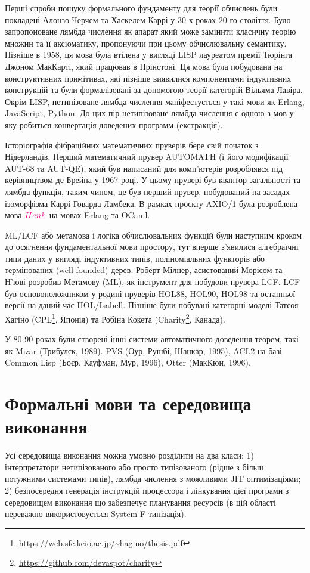 Перші спроби пошуку формального фундаменту для теорії обчислень були покладені
Алонзо Черчем та Хаскелем Каррі у 30-х роках 20-го століття. Було запропоноване
лямбда числення як апарат який може замінити класичну теорію множин та її аксіоматику,
пропонуючи при цьому обчислювальну семантику. Пізніше в 1958, ця мова була втілена
у вигляді LISP лауреатом премії Тюрінга Джоном МакКарті, який працював в Прінстоні.
Ця мова була побудована на конструктивних примітивах, які пізніше виявилися компонентами
індуктивних конструкцій та були формалізовані за допомогою
теорії категорій Вільяма Лавіра. Окрім LISP, нетипізоване лямбда числення
маніфестується у такі мови як Erlang, JavaScript, Python.
До цих пір нетипізоване лямбда числення є одною з мов у яку робиться
конвертація доведених программ (екстракція).

Історіографія фібраційних математичних пруверів бере свій початок з Нідерландів.
Перший математичний прувер AUTOMATH (і його модифікації AUT-68 та AUT-QE),
який був написаний для комп'ютерів розроблявся під керівництвом де Брейна у 1967 році.
У цьому прувері був квантор загальності та лямбда функція, таким чином, це був перший прувер,
побудований на засадах ізоморфізма Каррі-Говарда-Ламбека. В рамках проєкту AXIO/1
була розроблена мова $\textcolor{magenta}{Henk}$ на мовах Erlang та OCaml.

ML/LCF або метамова і логіка обчислювальних функцій були наступним кроком до
осягнення фундаментальної мови простору, тут вперше з'явилися алгебраїчні типи даних
у вигляді індуктивних типів, поліноміальних функторів або термінованих (well-founded) дерев.
Роберт Мілнер, асистований Морісом та Н'юві розробив Метамову (ML), як
інструмент для побудови прувера LCF. LCF був основоположником у родині пруверів
HOL88, HOL90, HOL98 та останньої версії на даний час HOL/Isabell.
Пізніше були побувані категорні моделі Татсоя Хагіно (CPL\footnote{\url{https://web.sfc.keio.ac.jp/~hagino/thesis.pdf}}, Японія)
та Робіна Кокета (Charity\footnote{\url{https://github.com/devaspot/charity}}, Канада).

У 80-90 роках були створені інші системи автоматичного доведення теорем,
такі як Mizar (Трибулєк, 1989). PVS (Оур, Рушбі, Шанкар, 1995),
ACL2 на базі Common Lisp (Боєр, Кауфман, Мур, 1996), Otter (МакКюн, 1996).

\section{Формальні мови та середовища виконання}
Усі середовища виконання можна умовно розділити на два класи:
1) інтерпретатори нетипізованого або просто
   типізованого (рідше з більш потужними системами типів),
   лямбда числення з можливими JIT оптимізаціями;
2) безпосередня генерація інструкцій процессора і лінкування цієї програми з
   середовищем виконання що забезпечує планування ресурсів (в цій області
   переважно використовується System F типізація).

